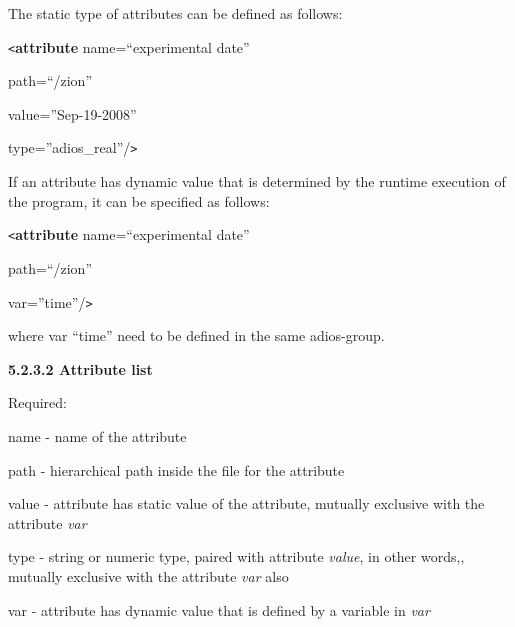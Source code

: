 \vspace{10pt}
The static type of attributes can be defined as follows:

\vspace{10pt}
\texttt{<}\textbf{attribute} name=``experimental date'' 

\vspace{10pt}
\leftskip=27pt
\parindent=43pt
path=``/zion''

\vspace{10pt}
value=''Sep-19-2008''

\vspace{10pt}
\parindent=0pt
type=''adios\_real''/\texttt{>}

\vspace{22pt}
\leftskip=0pt
If an attribute has dynamic value that is determined by the runtime execution of 
the program, it can be specified as follows:

\vspace{10pt}
\texttt{<}\textbf{attribute} name=``experimental date'' 

\vspace{10pt}
\leftskip=27pt
\parindent=43pt
path=``/zion''

\vspace{10pt}
var=''time''/\texttt{>}

\vspace{22pt}
\leftskip=0pt
\parindent=0pt
where var ``time'' need to be defined in the same adios-group.

\vspace{10pt}
\textbf{5.2.3.2 Attribute list}

\vspace{10pt}
Required:\label{HToc82067522}

\vspace{10pt}
\leftskip=18pt
\parindent=3pt
name -  name of the attribute

\vspace{10pt}
path - hierarchical path inside the file for the attribute

\vspace{10pt}
value - attribute has static value of the attribute, mutually exclusive with the 
attribute \textit{var}

\vspace{10pt}
type - string or numeric type, paired with attribute \textit{value}, in other words,, 
mutually exclusive with the attribute \textit{var} also

\vspace{10pt}
var - attribute has dynamic value that is defined by a variable in \textit{var\label{HToc84890246}\label{HToc212016622}\label{HToc212016864}\label{HToc182553369}}

